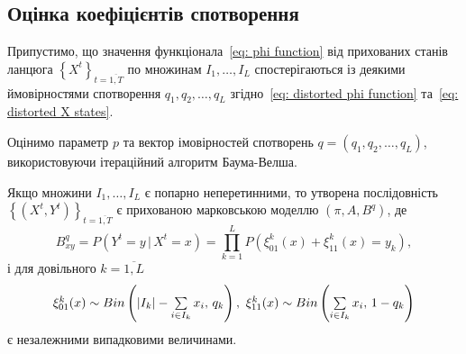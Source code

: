 \subsection{Оцінка коефіцієнтів спотворення}

Припустимо, що значення функціонала~\eqref{eq: phi function} від прихованих станів ланцюга $\left\{ X^t \right\}_{t=\overline{1,T}}$ по множинам $I_1,\ldots,I_L$ спостерігаються із деякими ймовірностями спотворення $q_1,q_2,\ldots,q_L$ згідно~\eqref{eq: distorted phi function} та~\eqref{eq: distorted X states}.

Оцінимо параметр $p$ та вектор імовірностей спотворень $q=\left( q_1,q_2,\ldots,q_L \right)$, використовуючи ітераційний алгоритм Баума-Велша.

\begin{claim}
    Якщо множини $I_1,\ldots,I_L$ є попарно неперетинними, то утворена послідовність $\left\{ \left( X^t,Y^t \right) \right\}_{t=\overline{1,T}}$ є прихованою марковською моделлю $\left( \pi,A,B^q \right)$, де 
    \begin{equation*}
        B^q_{xy} = P\left( Y^t=y\,|\,X^t=x \right) = \prod\limits_{k=1}^{L} P\left( \xi^k_{01}(x) + \xi^k_{11}(x) = y_k \right),
    \end{equation*}
    і для довільного $k=\overline{1,L}$
    \begin{equation*}\scaleq[1]{
        \xi^k_{01}(x) \sim Bin\left( |I_k| - \sum\limits_{i \in I_k} x_i,\, q_k \right),\ \xi^k_{11}(x) \sim Bin\left( \sum\limits_{i \in I_k} x_i,\, 1 - q_k \right)}
    \end{equation*}
    є незалежними випадковими величинами. 
\end{claim}

